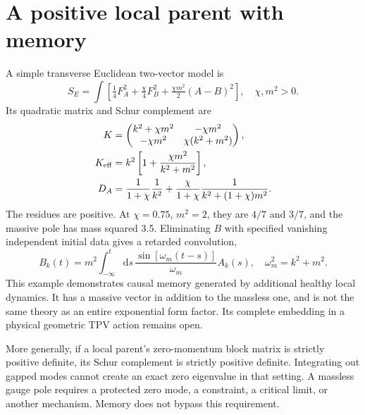 \documentclass[11pt,oneside]{report}
\newcommand{\dd}{\mathrm d}
\begin{document}
\section{A positive local parent with memory}
A simple transverse Euclidean two-vector model is
\begin{equation}
S_E=\int\left[\tfrac14F_A^2+\tfrac\chi4F_B^2+\tfrac{\chi m^2}{2}(A-B)^2\right],\quad\chi,m^2>0.
\end{equation}
Its quadratic matrix and Schur complement are
\begin{align}
K&=\begin{pmatrix}k^2+\chi m^2&-\chi m^2\\-\chi m^2&\chi(k^2+m^2)\end{pmatrix},\\
K_{\rm eff}&=k^2\left[1+\frac{\chi m^2}{k^2+m^2}\right],\\
D_A&=\frac1{1+\chi}\frac1{k^2}
+\frac\chi{1+\chi}\frac1{k^2+(1+\chi)m^2}.
\end{align}
The residues are positive. At $\chi=0.75$, $m^2=2$, they are $4/7$ and $3/7$, and the massive pole has mass squared 3.5. Eliminating $B$ with specified vanishing independent initial data gives a retarded convolution,
\begin{equation}
B_k(t)=m^2\int_{-\infty}^t\dd s\,
\frac{\sin[\omega_m(t-s)]}{\omega_m}A_k(s),\quad\omega_m^2=k^2+m^2.
\end{equation}
This example demonstrates causal memory generated by additional healthy local dynamics. It has a massive vector in addition to the massless one, and is not the same theory as an entire exponential form factor. Its complete embedding in a physical geometric TPV action remains open.

More generally, if a local parent's zero-momentum block matrix is strictly positive definite, its Schur complement is strictly positive definite. Integrating out gapped modes cannot create an exact zero eigenvalue in that setting. A massless gauge pole requires a protected zero mode, a constraint, a critical limit, or another mechanism. Memory does not bypass this requirement.
\end{document}
